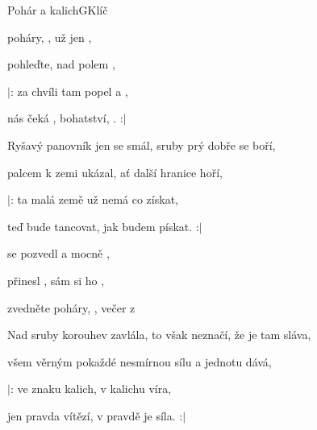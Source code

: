 \begin{song}{Pohár a kalich}{G}{Klíč}

\begin{SBVerse}

 poháry, , už jen   ,

pohleďte, nad polem    ,

$|$: za chvíli  tam popel a ,

   nás čeká , bohatství, . :$|$

\end{SBVerse}

\begin{SBVerse}

Ryšavý panovník jen se smál, sruby prý dobře se boří,

palcem k zemi ukázal, ať další hranice hoří,

$|$: ta malá země už nemá co získat,

   teď bude tancovat, jak budem pískat. :$|$

\end{SBVerse}

\begin{SBChorus}

 se pozvedl  a mocně ,

 přinesl , sám si ho ,


zvedněte poháry, , večer z   

\end{SBChorus}

\begin{SBVerse}

Nad sruby korouhev zavlála, to však neznačí, že je tam sláva,

všem věrným pokaždé nesmírnou sílu a jednotu dává,

$|$: ve znaku kalich, v kalichu víra,

   jen pravda vítězí, v pravdě je síla. :$|$

\end{SBVerse}

\begin{SBVerse}


\end{SBVerse}
\end{song}
